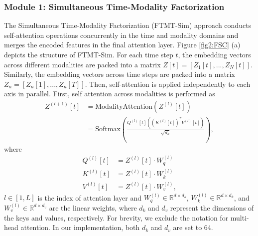 \subsubsection{Module 1: Simultaneous Time-Modality Factorization }
The Simultaneous Time-Modality Factorization (FTMT-Sim) approach conducts self-attention operations concurrently in the time and modality domains and merges the encoded features in the final attention layer. Figure \ref{fig2:FSC} (a) depicts the structure of FTMT-Sim. For each time step $t$, the embedding vectors across different modalities are packed into a matrix $Z[t]=[Z_{1}[t],...,Z_{N}[t]]$. Similarly, the embedding vectors across time steps are packed into a matrix $Z_{n}=[Z_{n}[1],...,Z_{n}[T]]$. Then, self-attention is applied independently to each axis in parallel. First, self attention across modalities is performed as
\begin{equation}
    \begin{split}
    Z^{(l+1)}[t] &= \mathrm{ModalityAttention}(Z^{(l)}[t]) \\ 
    &= \mathrm{Softmax}\left( \frac{Q^{(l)}[t]((K^{(l)}[t])^{T}V^{(l)}[t])}{\sqrt{d_{k}}} \right),
    \end{split}    
\end{equation}
where 
\begin{equation}
    \begin{split}
    Q^{(l)}[t] &= Z^{(l)}[t] \cdot W^{(l)}_{q}  \\
    K^{(l)}[t] &= Z^{(l)}[t] \cdot W^{(l)}_{k}  \\
    V^{(l)}[t] &= Z^{(l)}[t] \cdot W^{(l)}_{v},
    \end{split}
\end{equation}
$l \in [1,L] $ is the index of attention layer and $W^{(l)}_{q} \in \mathbb{R}^{d \times d_{k}}$, $W^{(l)}_{k} \in \mathbb{R}^{d \times d_{k}}$, and $W^{(l)}_{v} \in \mathbb{R}^{d \times d_{v}}$ are the linear weights, where $d_{k}$ and $d_{v}$ represent the dimensions of the keys and values, respectively. For brevity, we exclude the notation for multi-head attention.
In our implementation, both $d_{k}$ and $d_{v}$ are set to 64.

